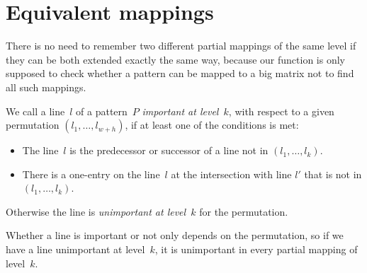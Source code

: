 \section{Equivalent mappings}
There is no need to remember two different partial mappings of the same level if they can be both extended exactly the same way, because our function is only supposed to check whether a pattern can be mapped to a big matrix not to find all such mappings.
\pagebreak
\begin{defn}
We call a line~$l$ of a pattern~$P$ \emph{important at level~$k$}, with respect to a given permutation $(l_1,\dots,l_{w+h})$, if at least one of the conditions is met:
\begin{itemize}
\item The line~$l$ is the predecessor or successor of a line not in $(l_1,\dots,l_k)$.
\item There is a one-entry on the line~$l$ at the intersection with line $l'$ that is not in $(l_1,\dots,l_k)$.
\end{itemize}
Otherwise the line is \emph{unimportant at level~$k$} for the permutation.
\end{defn}
Whether a line is important or not only depends on the permutation, so if we have a line unimportant at level~$k$, it is unimportant in every partial mapping of level~$k$.

